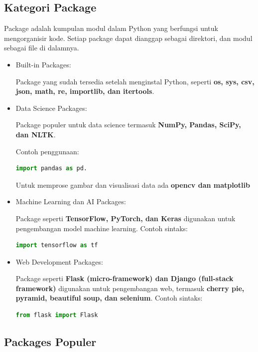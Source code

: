 \documentclass{article}
\begin{document}
\subsection{Kategori Package}
Package adalah kumpulan modul dalam Python yang berfungsi untuk mengorganisir kode. Setiap package dapat dianggap sebagai direktori, dan modul sebagai file di dalamnya.
\begin{itemize}
    \item Built-in Packages:

          Package yang sudah tersedia setelah menginstal Python, seperti \textbf{os, sys, csv, json, math, re, importlib, dan itertools}.
    \item Data Science Packages:

          Package populer untuk data science termasuk \textbf{NumPy, Pandas, SciPy, dan NLTK}.

          Contoh penggunaan:
          \begin{lstlisting}[language=Python, caption={}, captionpos=b]
import pandas as pd.
\end{lstlisting}

          Untuk memprose gambar dan visualisasi data ada \textbf{opencv dan matplotlib}
    \item Machine Learning dan AI Packages:

          Package seperti \textbf{TensorFlow, PyTorch, dan Keras} digunakan untuk pengembangan model machine learning. Contoh sintaks:
          \begin{lstlisting}[language=Python, caption={}, captionpos=b]
import tensorflow as tf
\end{lstlisting}
    \item Web Development Packages:

          Package seperti \textbf{Flask (micro-framework) dan Django (full-stack framework)} digunakan untuk pengembangan web, termasuk \textbf{cherry pie, pyramid, beautiful soup, dan selenium}. Contoh sintaks:
          \begin{lstlisting}[language=Python, caption={}, captionpos=b]
from flask import Flask
\end{lstlisting}
\end{itemize}

\subsection{Packages Populer}
\end{document}

